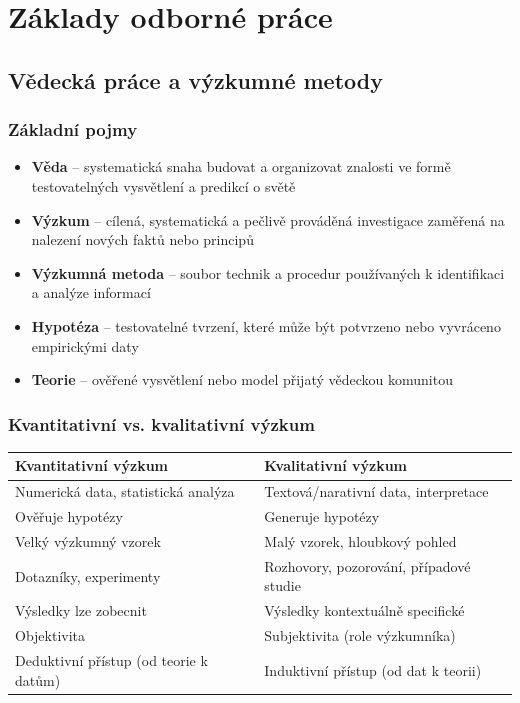 \section{Základy odborné práce}

\subsection{Vědecká práce a výzkumné metody}

\subsubsection{Základní pojmy}

\begin{itemize}
  \item \textbf{Věda} -- systematická snaha budovat a organizovat znalosti ve formě testovatelných vysvětlení a predikcí o světě
  \item \textbf{Výzkum} -- cílená, systematická a pečlivě prováděná investigace zaměřená na nalezení nových faktů nebo principů
  \item \textbf{Výzkumná metoda} -- soubor technik a procedur používaných k identifikaci a analýze informací
  \item \textbf{Hypotéza} -- testovatelné tvrzení, které může být potvrzeno nebo vyvráceno empirickými daty
  \item \textbf{Teorie} -- ověřené vysvětlení nebo model přijatý vědeckou komunitou
\end{itemize}

\subsubsection{Kvantitativní vs. kvalitativní výzkum}

\begin{center}
\begin{tabular}{p{6cm}p{6cm}}
\toprule
\textbf{Kvantitativní výzkum} & \textbf{Kvalitativní výzkum} \\
\midrule
Numerická data, statistická analýza & Textová/narativní data, interpretace \\
Ověřuje hypotézy & Generuje hypotézy \\
Velký výzkumný vzorek & Malý vzorek, hloubkový pohled \\
Dotazníky, experimenty & Rozhovory, pozorování, případové studie \\
Výsledky lze zobecnit & Výsledky kontextuálně specifické \\
Objektivita & Subjektivita (role výzkumníka) \\
Deduktivní přístup (od teorie k datům) & Induktivní přístup (od dat k teorii) \\
\bottomrule
\end{tabular}
\end{center}

